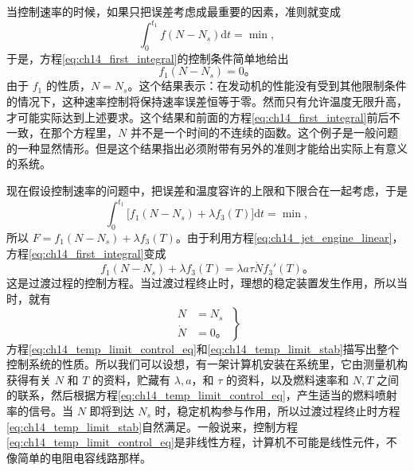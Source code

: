 当控制速率的时候，如果只把误差考虑成最重要的因素，准则就变成
\begin{equation*}
\int_{0}^{t_1} f(N-N_s)\mathrm{d}t = \min,
\end{equation*}
于是，方程\eqref{eq:ch14_first_integral}的控制条件简单地给出
\begin{equation*}
f_1(N-N_s) = 0。
\end{equation*}
由于 $f_1$ 的性质，$N=N_s$。这个结果表示：在发动机的性能没有受到其他限制条件的情况下，这种速率控制将保持速率误差恒等于零。然而只有允许温度无限升高，才可能实际达到上述要求。这个结果和前面的方程\eqref{eq:ch14_first_integral}前后不一致，在那个方程里，$N$ 并不是一个时间的不连续的函数。这个例子是一般问题的一种显然情形。但是这个结果指出必须附带有另外的准则才能给出实际上有意义的系统。

现在假设控制速率的问题中，把误差和温度容许的上限和下限合在一起考虑，于是
\begin{equation}
\int_{0}^{t_1} \big[f_1(N-N_s)+\lambda f_3(T)\big]\mathrm{d}t = \min,
\label{eq:ch14_temp_limit_perf}
\end{equation}
所以 $F=f_1(N-N_s)+\lambda f_3(T)$。由于利用方程\eqref{eq:ch14_jet_engine_linear}，方程\eqref{eq:ch14_first_integral}变成
\begin{equation}
f_1(N-N_s)+\lambda f_3(T) = \lambda a\tau \dot{N}f_3'(T)。
\label{eq:ch14_temp_limit_control_eq}
\end{equation}
这是过渡过程的控制方程。当过渡过程终止时，理想的稳定装置发生作用，所以当时，就有
\begin{equation}
\left.
\begin{aligned}
N &= N_s \\
\dot{N} &= 0。
\end{aligned}
\right\}
\label{eq:ch14_temp_limit_stab}
\end{equation}
方程\eqref{eq:ch14_temp_limit_control_eq}和\eqref{eq:ch14_temp_limit_stab}描写出整个控制系统的性质。所以我们可以设想，有一架计算机安装在系统里，它由测量机构获得有关 $N$ 和 $T$ 的资料，贮藏有 $\lambda,a$，和 $\tau$ 的资料，以及燃料速率和 $N,T$ 之间的联系，然后根据方程\eqref{eq:ch14_temp_limit_control_eq}，产生适当的燃料喷射率的信号。当 $N$ 即将到达 $N_s$ 时，稳定机构参与作用，所以过渡过程终止时方程\eqref{eq:ch14_temp_limit_stab}自然满足。一般说来，控制方程\eqref{eq:ch14_temp_limit_control_eq}是非线性方程，计算机不可能是线性元件，不像简单的电阻电容线路那样。

